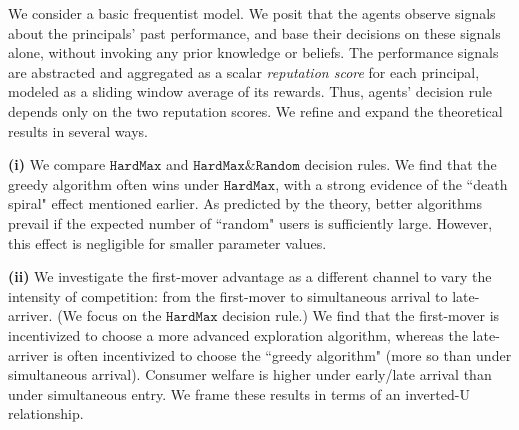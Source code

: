\documentclass[10pt]{article}
\newcommand{\ExptsModel}{reputation-choice model\xspace}
\newcommand{\term}[1]{\ensuremath{\mathtt{#1}}\xspace}
\newcommand{\HardMax}{\term{HardMax}}
\newcommand{\HardMaxRandom}{\term{HardMax\&Random}}
\begin{document}
We consider a basic frequentist model. We posit that the agents observe signals about the principals' past performance, and base their decisions on these signals alone, without invoking any prior knowledge or beliefs. The performance signals are abstracted and aggregated as a scalar \emph{reputation score} for each principal, modeled as a sliding window average of its rewards. Thus, agents' decision rule depends only on the two reputation scores.
We refine and expand the theoretical results in several ways.

\textbf{(i)}
We compare \HardMax and \HardMaxRandom decision rules. We find that the greedy algorithm often wins under \HardMax, with a strong evidence of the ``death spiral" effect mentioned earlier.
 As predicted by the theory, better algorithms prevail if the expected number of ``random" users is sufficiently large. However, this effect is negligible for smaller parameter values.


\textbf{(ii)}
 We investigate the first-mover advantage as a different channel to vary the intensity of competition: from the first-mover to simultaneous arrival to late-arriver. (We focus on the \HardMax decision rule.) We find that the first-mover is incentivized to choose a more advanced exploration algorithm, whereas the late-arriver is often incentivized to choose the ``greedy algorithm" (more so than under simultaneous arrival). Consumer welfare is higher under early/late arrival than under simultaneous entry. We frame these results in terms of an inverted-U relationship.


\end{document}
